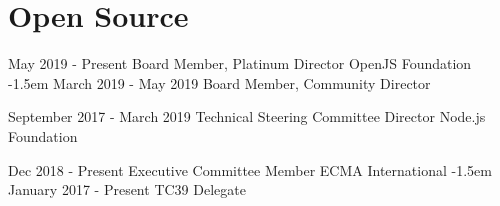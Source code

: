 \documentclass[10pt,a4paper,sans]{moderncv}   %
\begin{document}
%


\section{Open Source}

\cventry
  {May 2019 - Present}
  {Board Member, Platinum Director}
  {OpenJS Foundation}
  {}{}{}
\kern-1.5em
\cventry
  {March 2019 - May 2019}
  {Board Member, Community Director}
  {}
  {}{}{}

\cventry
  {September 2017 - March 2019}
  {Technical Steering Committee Director}
  {Node.js Foundation}
  {}{}{}

\cventry
  {Dec 2018 - Present}
  {Executive Committee Member}
  {ECMA International}
  {}{}{}
\kern-1.5em
\cventry
  {January 2017 - Present}
  {TC39 Delegate}
  {}
  {}{}{}
\end{document}
